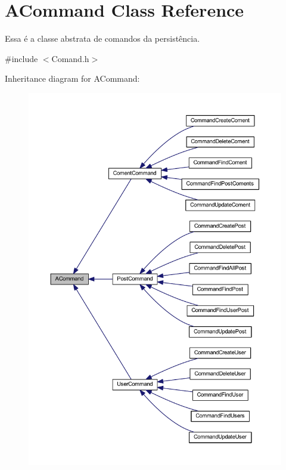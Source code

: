 \hypertarget{class_a_command}{\section{A\-Command Class Reference}
\label{class_a_command}
}


Essa é a classe abstrata de comandos da persistência.  




{\ttfamily \#include $<$Comand.\-h$>$}



Inheritance diagram for A\-Command\-:\nopagebreak
\begin{figure}[H]
\begin{center}
\leavevmode
\includegraphics[width=350pt]{class_a_command__inherit__graph}
\end{center}
\end{figure}


